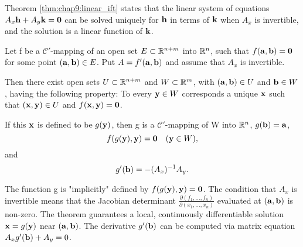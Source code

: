 \begin{remark}
  Theorem \ref{thm:chap9:linear_ift} states that the linear system of
  equations $A_x \mathbf{h} + A_y \mathbf{k} = \mathbf{0}$ can be solved
  uniquely for $\mathbf{h}$ in terms of $\mathbf{k}$ when $A_x$ is
  invertible, and the solution is a linear function of $\mathbf{k}$.
\end{remark}

\begin{theorem}
  \label{thm:chap9:implicit_function_thm}
  Let f be a $\mathcal{C}'$-mapping of an open set $E \subset
  \mathbb{R}^{n+m}$ into $\mathbb{R}^n$, such that $f(\mathbf{a}, \mathbf{b}) = \mathbf{0}$
  for some point $(\mathbf{a}, \mathbf{b}) \in E$. Put $A = f'(\mathbf{a},
  \mathbf{b})$ and assume that $A_x$ is invertible.

  Then there exist open sets $U \subset \mathbb{R}^{n+m}$ and $W \subset
  \mathbb{R}^m$, with $(\mathbf{a}, \mathbf{b}) \in U$ and $\mathbf{b} \in W$,
  having the following property:
  To every $\mathbf{y} \in W$ corresponds a unique $\mathbf{x}$ such that
  $(\mathbf{x}, \mathbf{y}) \in U$ and $f(\mathbf{x}, \mathbf{y}) = \mathbf{0}$.

  If this $\mathbf{x}$ is defined to be $g(\mathbf{y})$, then g is a
  $\mathcal{C}'$-mapping of W into $\mathbb{R}^n$, $g(\mathbf{b}) = \mathbf{a}$,
  \[
    f(g(\mathbf{y}), \mathbf{y}) = \mathbf{0} \quad (\mathbf{y} \in W),
  \]
  and
  \[
    g'(\mathbf{b}) = -(A_x)^{-1} A_y.
  \]
\end{theorem}

\begin{remark}
  The function g is "implicitly" defined by $f(g(\mathbf{y}), \mathbf{y})
  = \mathbf{0}$. The condition that $A_x$ is invertible means that the
  Jacobian determinant $\frac{\partial(f_1, \dots,
  f_n)}{\partial(x_1, \dots, x_n)}$ evaluated at $(\mathbf{a},
  \mathbf{b})$ is non-zero. The theorem guarantees a local,
  continuously differentiable solution $\mathbf{x} = g(\mathbf{y})$ near
  $(\mathbf{a}, \mathbf{b})$. The derivative $g'(\mathbf{b})$ can be
  computed via matrix equation $A_x g'(\mathbf{b}) + A_y = 0$.
\end{remark}

